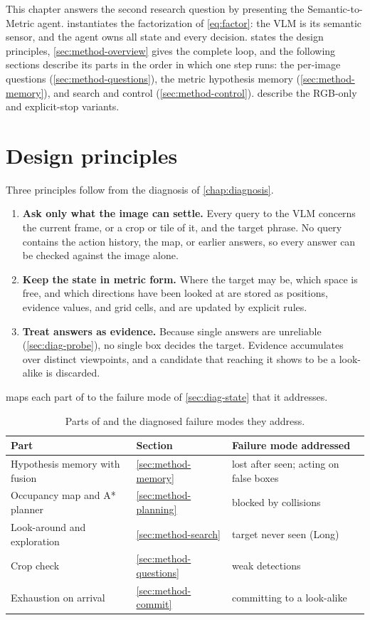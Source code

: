 \label{chap:method}
This chapter answers the second research question by presenting the Semantic-to-Metric agent. \ours instantiates the
factorization of \cref{eq:factor}: the VLM is its semantic sensor, and the agent owns all state and every decision.
 states the design principles, \cref{sec:method-overview} gives the complete loop, and
the following sections describe its parts in the order in which one step runs: the per-image questions
(\cref{sec:method-questions}), the metric hypothesis memory (\cref{sec:method-memory}), and search and control
(\cref{sec:method-control}).  describe the RGB-only and explicit-stop variants.

\section{Design principles}
\label{sec:method-principles}
Three principles follow from the diagnosis of \cref{chap:diagnosis}.
\begin{enumerate}
\item \textbf{Ask only what the image can settle.} Every query to the VLM concerns the current frame, or a crop or tile
of it, and the target phrase. No query contains the action history, the map, or earlier answers, so every answer can
be checked against the image alone.
\item \textbf{Keep the state in metric form.} Where the target may be, which space is free, and which directions have
been looked at are stored as positions, evidence values, and grid cells, and are updated by explicit rules.
\item \textbf{Treat answers as evidence.} Because single answers are unreliable (\cref{sec:diag-probe}), no single
box decides the target. Evidence accumulates over distinct viewpoints, and a candidate that reaching it shows to be
a look-alike is discarded.
\end{enumerate}
 maps each part of \ours to the failure mode of \cref{sec:diag-state} that it addresses.

\begin{table}[htbp]
\centering\small
\caption{Parts of \ours and the diagnosed failure modes they address.}
\label{tab:design-map}
\begin{tabular*}{\linewidth}{@{\extracolsep{\fill}}lll@{}}
\toprule
Part & Section & Failure mode addressed\\
\midrule
Hypothesis memory with fusion & \cref{sec:method-memory} & lost after seen; acting on false boxes\\
Occupancy map and A* planner & \cref{sec:method-planning} & blocked by collisions\\
Look-around and exploration & \cref{sec:method-search} & target never seen (Long)\\
Crop check & \cref{sec:method-questions} & weak detections\\
Exhaustion on arrival & \cref{sec:method-commit} & committing to a look-alike\\
\bottomrule
\end{tabular*}
\end{table}

